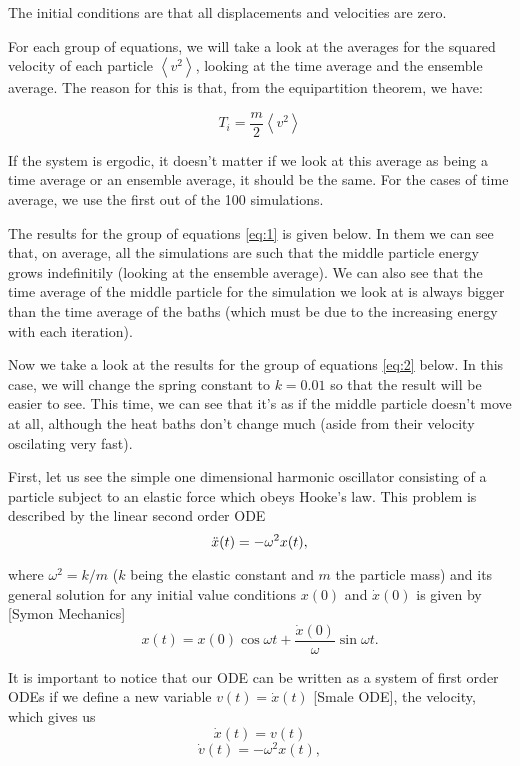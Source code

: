 The initial conditions are that all displacements and velocities are zero.

For each group of equations, we will take a look at the averages for the squared velocity of each particle $\left<v^2\right>$, looking at the time average and the ensemble average. The reason for this is that, from the equipartition theorem, we have:

$$T_i = \frac{m}{2}\left<v^2\right>$$

If the system is ergodic, it doesn't matter if we look at this average as being a time average or an ensemble average, it should be the same. For the cases of time average, we use the first out of the 100 simulations.

The results for the group of equations \ref{eq:1} is given below. In them we can see that, on average, all the simulations are such that the middle particle energy grows indefinitily (looking at the ensemble average). 
We can also see that the time average of the middle particle for the simulation we look at is always bigger than the time average of the baths (which must be due to the increasing energy with each iteration).



Now we take a look at the results for the group of equations \ref{eq:2} below. In this case, we will change the spring constant to $k=0.01$ so that the result will be easier to see.
This time, we can see that it's as if the middle particle doesn't move at all, although the heat baths don't change much (aside from their velocity oscilating very fast).










First, let us see the simple one dimensional harmonic oscillator consisting of a particle subject to an elastic force which obeys Hooke's law. This problem is described by the linear second order ODE
$$\Ddot{x}(t) = -\omega^2 x(t),$$

where $\omega^2 = k/m$ ($k$ being the elastic constant and $m$ the particle mass) and its general solution for any initial value conditions $x(0)$ and $\Dot{x}(0)$ is given by [Symon Mechanics]
$$ x(t) = x(0)\cos{\omega t} + \frac{\Dot{x}(0)}{\omega}\sin{\omega t}.$$

It is important to notice that our ODE can be written as a system of first order ODEs if we define a new variable $v(t)=\Dot{x}(t)$ [Smale ODE], the velocity, which gives us
$$\Dot{x}(t) = v(t)$$
$$\Dot{v}(t) = -\omega^2 x(t),$$

